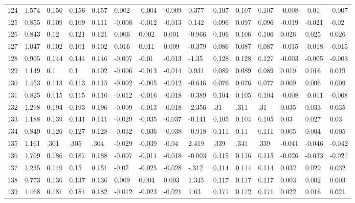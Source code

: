 \begin{table}
\begin{tabular}{|l|l|lll|lll|l|lll|lll}
		124 & 1.574 & 0.156 & 0.156 & 0.157 & 0.002 & -0.004 & -0.009 & 0.377 & 0.107 & 0.107 & 0.107 & -0.008 & -0.01 & -0.007 \\
		125 & 0.855 & 0.109 & 0.109 & 0.111 & -0.008 & -0.012 & -0.013 & 0.142 & 0.096 & 0.097 & 0.096 & -0.019 & -0.021 & -0.02 \\
		126 & 0.843 & 0.12 & 0.121 & 0.121 & 0.006 & 0.002 & 0.001 & -0.966 & 0.106 & 0.106 & 0.106 & 0.026 & 0.025 & 0.026 \\
		127 & 1.047 & 0.102 & 0.101 & 0.102 & 0.016 & 0.011 & 0.009 & -0.379 & 0.086 & 0.087 & 0.087 & -0.015 & -0.018 & -0.015 \\
		128 & 0.905 & 0.144 & 0.144 & 0.146 & -0.007 & -0.01 & -0.013 & -1.35 & 0.128 & 0.128 & 0.127 & -0.003 & -0.005 & -0.003 \\
		129 & 1.149 & 0.1 & 0.1 & 0.102 & -0.006 & -0.013 & -0.014 & 0.931 & 0.089 & 0.089 & 0.089 & 0.019 & 0.016 & 0.019 \\
		130 & 1.453 & 0.113 & 0.113 & 0.115 & -0.002 & -0.005 & -0.012 & -0.646 & 0.076 & 0.076 & 0.077 & 0.009 & 0.006 & 0.009 \\
		131 & 0.825 & 0.115 & 0.115 & 0.116 & -0.012 & -0.016 & -0.018 & -0.389 & 0.104 & 0.105 & 0.104 & -0.008 & -0.011 & -0.008 \\
		132 & 1.298 & 0.194 & 0.193 & 0.196 & -0.009 & -0.013 & -0.018 & -2.356 & .31 & .311 & .31 & 0.035 & 0.033 & 0.035 \\
		133 & 1.188 & 0.139 & 0.141 & 0.141 & -0.029 & -0.035 & -0.037 & -0.141 & 0.105 & 0.104 & 0.105 & 0.03 & 0.027 & 0.03 \\
		134 & 0.849 & 0.126 & 0.127 & 0.128 & -0.032 & -0.036 & -0.038 & -0.918 & 0.111 & 0.11 & 0.111 & 0.005 & 0.004 & 0.005 \\
		135 & 1.161 & .301 & .305 & .304 & -0.029 & -0.039 & -0.04 & 2.419 & .339 & .341 & .339 & -0.041 & -0.046 & -0.042 \\
		136 & 1.709 & 0.186 & 0.187 & 0.188 & -0.007 & -0.011 & -0.018 & -0.003 & 0.115 & 0.116 & 0.115 & -0.026 & -0.033 & -0.027 \\
		137 & 1.235 & 0.149 & 0.15 & 0.151 & -0.02 & -0.025 & -0.028 & -.312 & 0.114 & 0.114 & 0.114 & 0.032 & 0.029 & 0.032 \\
		138 & 0.773 & 0.136 & 0.137 & 0.136 & 0.009 & 0.004 & 0.003 & 1.345 & 0.117 & 0.117 & 0.117 & 0.003 & 0.002 & 0.003 \\
		139 & 1.468 & 0.181 & 0.184 & 0.182 & -0.012 & -0.023 & -0.021 & 1.63 & 0.171 & 0.172 & 0.171 & 0.022 & 0.016 & 0.021 \\

\end{tabular}
\end{table}
